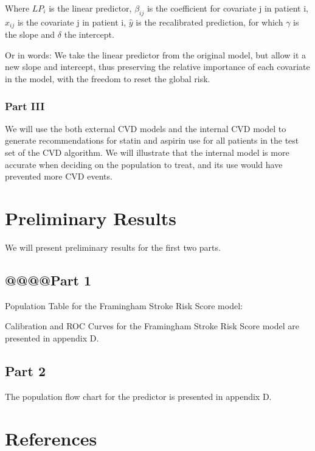 \documentclass[a4paper,12pt]{article}
\begin{document}
		Where $ LP_i $ is the linear predictor, $ \beta_{ij} $ is the coefficient for covariate j in patient i, $ x_{ij} $ is the covariate j in patient i, $ \hat{y} $ is the recalibrated prediction, for which $ \gamma $ is the slope and $ \delta $ the intercept.
		
		Or in words: We take the linear predictor from the original model, but allow it a new slope and intercept, thus preserving the relative importance of each covariate in the model, with the freedom to reset the global risk.
		
		\subsubsection{Part III}
		We will use the both external CVD models and the internal CVD model to generate recommendations for statin and aspirin use for all patients in the test set of the CVD algorithm. We will illustrate that the internal model is more accurate when deciding on the population to treat, and its use would have prevented more CVD events.
		
	\section{Preliminary Results}
	We will present preliminary results for the first two parts.

	\subsection{@@@@Part 1}

	Population Table for the Framingham Stroke Risk Score\cite{DAgostino1994} model:

	
	Calibration and ROC Curves for the Framingham Stroke Risk Score model are presented in appendix D.
	
	\subsection{Part 2}
	
	The population flow chart for the predictor is presented in appendix D.
	
	\section{References}
	
   	\printbibliography[heading=none]
   	
\end{document}
